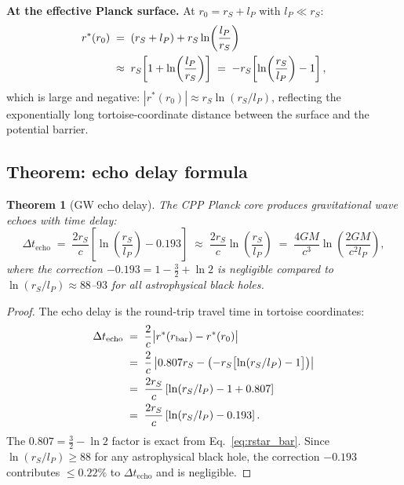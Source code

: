 \documentclass[12pt]{article}
\newtheorem{theorem}{Theorem}[section]
\newcommand{\lP}{l_P}
\newcommand{\rS}{r_S}
\newcommand{\Dt}{\Delta t_{\mathrm{echo}}}
\newcommand{\rstar}{r^*}
\begin{document}
\textbf{At the effective Planck surface.}
At $r_0 = \rS + \lP$ with $\lP \ll \rS$:
\begin{align}
  \rstar(r_0)
  &\;=\; (\rS + \lP) + \rS\ln\!\left(\frac{\lP}{\rS}\right) \notag\\
  &\;\approx\; \rS\!\left[1 + \ln\!\left(\frac{\lP}{\rS}\right)\right]
  \;=\; -\rS\!\left[\ln\!\left(\frac{\rS}{\lP}\right) - 1\right],
  \label{eq:rstar_0}
\end{align}
which is large and negative: $|\rstar(r_0)| \approx \rS\ln(\rS/\lP)$,
reflecting the exponentially long tortoise-coordinate distance between
the surface and the potential barrier.

\subsection{Theorem: echo delay formula}

\begin{theorem}[GW echo delay]
\label{thm:echo}
The CPP Planck core produces gravitational wave echoes with time delay:
\begin{equation}
  \boxed{\Dt \;=\; \frac{2\rS}{c}\!\left[\ln\!\left(\frac{\rS}{\lP}\right)
  - 0.193\right]
  \;\approx\; \frac{2\rS}{c}\ln\!\left(\frac{\rS}{\lP}\right)
  \;=\; \frac{4GM}{c^3}\ln\!\left(\frac{2GM}{c^2\lP}\right),}
  \label{eq:delay}
\end{equation}
where the correction $-0.193 = 1 - \tfrac{3}{2} + \ln 2$ is negligible
compared to $\ln(\rS/\lP) \approx 88$--$93$ for all astrophysical black holes.
\end{theorem}

\begin{proof}
The echo delay is the round-trip travel time in tortoise coordinates:
\begin{align}
  \Dt &\;=\; \frac{2}{c}\bigl|\rstar(r_{\mathrm{bar}}) - \rstar(r_0)\bigr|
  \notag\\
  &\;=\; \frac{2}{c}\left|0.807\rS
  - \left(-\rS\bigl[\ln(\rS/\lP) - 1\bigr]\right)\right| \notag\\
  &\;=\; \frac{2\rS}{c}\left[\ln(\rS/\lP) - 1 + 0.807\right] \notag\\
  &\;=\; \frac{2\rS}{c}\left[\ln(\rS/\lP) - 0.193\right].
  \label{eq:proof_delay}
\end{align}
The $0.807 = \tfrac{3}{2} - \ln 2$ factor is exact from
Eq.~\eqref{eq:rstar_bar}.  Since $\ln(\rS/\lP) \geq 88$ for any
astrophysical black hole, the correction $-0.193$ contributes $\leq 0.22\%$
to $\Dt$ and is negligible.
\end{proof}
\end{document}
